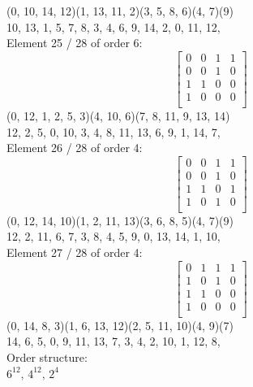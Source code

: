(0, 10, 14, 12)(1, 13, 11, 2)(3, 5, 8, 6)(4, 7)(9)\\
10, 13, 1, 5, 7, 8, 3, 4, 6, 9, 14, 2, 0, 11, 12, \\
Element    25 / 28 of order 6:
$$
\left[
\begin{array}{*{4}{r}}
0 & 0 & 1 & 1\\
0 & 0 & 1 & 0\\
1 & 1 & 0 & 0\\
1 & 0 & 0 & 0\\
\end{array}
\right]
$$
(0, 12, 1, 2, 5, 3)(4, 10, 6)(7, 8, 11, 9, 13, 14)\\
12, 2, 5, 0, 10, 3, 4, 8, 11, 13, 6, 9, 1, 14, 7, \\
Element    26 / 28 of order 4:
$$
\left[
\begin{array}{*{4}{r}}
0 & 0 & 1 & 1\\
0 & 0 & 1 & 0\\
1 & 1 & 0 & 1\\
1 & 0 & 1 & 0\\
\end{array}
\right]
$$
(0, 12, 14, 10)(1, 2, 11, 13)(3, 6, 8, 5)(4, 7)(9)\\
12, 2, 11, 6, 7, 3, 8, 4, 5, 9, 0, 13, 14, 1, 10, \\
Element    27 / 28 of order 4:
$$
\left[
\begin{array}{*{4}{r}}
0 & 1 & 1 & 1\\
1 & 0 & 1 & 0\\
1 & 1 & 0 & 0\\
1 & 0 & 0 & 0\\
\end{array}
\right]
$$
(0, 14, 8, 3)(1, 6, 13, 12)(2, 5, 11, 10)(4, 9)(7)\\
14, 6, 5, 0, 9, 11, 13, 7, 3, 4, 2, 10, 1, 12, 8, \\
Order structure:\\
$
6^{12},\, 4^{12},\, 2^4 $
\\

